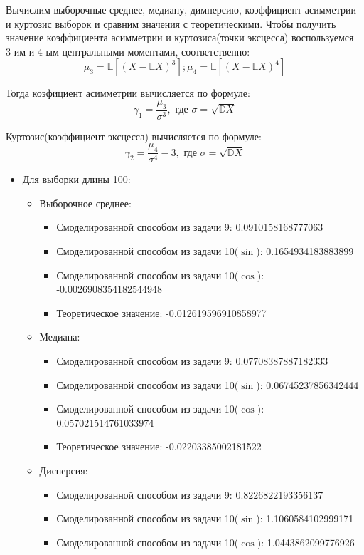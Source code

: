 \documentclass{article}
\begin{document}
Вычислим выборочные среднее, медиану, димперсию, коэффициент асимметрии и куртозис выборок и сравним значения с теоретическими. Чтобы получить значение коэффициента асимметрии и куртозиса(точки эксцесса) воспользуемся 3-им и 4-ым центральными моментами, соответственно:
\[\mu_3 = \mathbb{E}\left[\left(X - \mathbb{E}X\right)^3\right]; 
\mu_4 = \mathbb{E}\left[\left(X - \mathbb{E}X\right)^4\right]\]

Тогда коэфициент асимметрии вычисляется по формуле:
\[\gamma_1 = \frac{\mu_3}{\sigma^3}, \text{ где } \sigma = \sqrt{\mathbb{D}X}\]

Куртозис(коэффициент эксцесса) вычисляется по формуле:
\[\gamma_2 = \frac{\mu_4}{\sigma^4} - 3, \text{ где } \sigma = \sqrt{\mathbb{D}X}\]
\begin{itemize}
	\item Для выборки длины 100:
	\begin{itemize}
		\item Выборочное среднее:
		\begin{itemize}
			\item Смоделированной способом из задачи 9: 0.0910158168777063
			\item Смоделированной способом из задачи 10($\sin$): 0.1654934183883899
			\item Смоделированной способом из задачи 10($\cos$): -0.0026908354182544948
			\item Теоретическое значение: -0.012619596910858977
		\end{itemize}
		\item Медиана:
		\begin{itemize}
			\item Смоделированной способом из задачи 9: 0.07708387887182333
			\item Смоделированной способом из задачи 10($\sin$): 0.06745237856342444
			\item Смоделированной способом из задачи 10($\cos$): 0.057021514761033974
			\item Теоретическое значение: -0.02203385002181522
		\end{itemize}
		\item Дисперсия:
		\begin{itemize}
			\item Смоделированной способом из задачи 9: 0.8226822193356137
			\item Смоделированной способом из задачи 10($\sin$): 1.1060584102999171
			\item Смоделированной способом из задачи 10($\cos$): 1.0443862099776926

\end{itemize}
\end{itemize}
\end{itemize}
\end{document}

